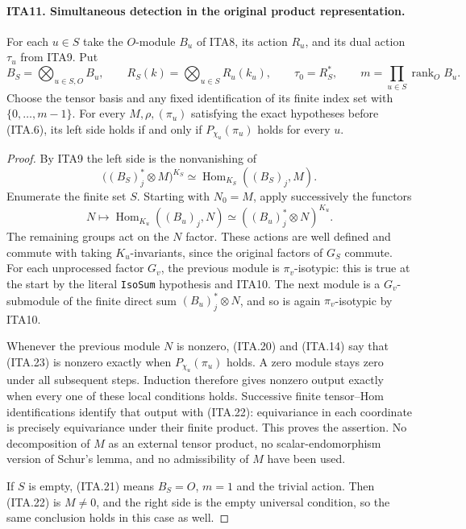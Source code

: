 \documentclass[11pt,a4paper]{article}
\numberwithin{equation}{section}
\theoremstyle{remark}\newtheorem{remark}[theorem]{Remark}
\begin{document}
\paragraph{ITA11. Simultaneous detection in the original product representation.}
\label{claim:ITA11}
For each $u\in S$ take the $O$-module $B_u$ of ITA8,
its action $R_u$, and its dual action $\tau_u$ from ITA9.
Put
\[
 B_S=\bigotimes_{u\in S,O}B_u,\qquad
 R_S(k)=\bigotimes_{u\in S}R_u(k_u),\qquad
 \tau_0=R_S^*,\qquad m=\prod_{u\in S}\operatorname{rank}_O B_u.
                                                               \tag{ITA.21}
\]
Choose the tensor basis and any fixed identification of its
finite index set with $\{0,\ldots,m-1\}$.  For every
$M,\rho,(\pi_u)$ satisfying the exact hypotheses before
(ITA.6), its left side holds if and only if
$P_{\chi_u}(\pi_u)$ holds for every $u$.
\begin{proof}
By ITA9 the left side is the nonvanishing of
\[
 \bigl((B_S)_j^*\otimes M\bigr)^{K_S}
                \simeq\operatorname{Hom}_{K_S}((B_S)_j,M).
                                                               \tag{ITA.22}
\]
Enumerate the finite set $S$.  Starting with $N_0=M$,
apply successively the functors
\[
                    N\longmapsto
                    \operatorname{Hom}_{K_u}((B_u)_j,N)
                      \simeq((B_u)_j^*\otimes N)^{K_u}.
                                                               \tag{ITA.23}
\]
The remaining groups act on the $N$ factor.  These actions
are well defined and commute with taking $K_u$-invariants,
since the original factors of $G_S$ commute.  For each
unprocessed factor $G_v$, the previous module is
$\pi_v$-isotypic: this is true at the start by the
literal \texttt{Iso\allowbreak Sum} hypothesis and ITA10.  The next
module is a $G_v$-submodule of the finite direct sum
$(B_u)_j^*\otimes N$, and so is again $\pi_v$-isotypic
by ITA10.

Whenever the previous module $N$ is nonzero, (ITA.20)
and (ITA.14) say that (ITA.23) is nonzero exactly when
$P_{\chi_u}(\pi_u)$ holds.  A zero module stays zero
under all subsequent steps.  Induction therefore gives
nonzero output exactly when every one of these local
conditions holds.  Successive finite tensor--Hom
identifications identify that output with (ITA.22):
equivariance in each coordinate is precisely equivariance
under their finite product.  This proves the assertion.
No decomposition of $M$ as an external tensor product,
no scalar-endomorphism version of Schur's lemma, and no
admissibility of $M$ have been used.

If $S$ is empty, (ITA.21) means $B_S=O$, $m=1$ and
the trivial action.  Then (ITA.22) is $M\ne0$, and
the right side is the empty universal condition, so the
same conclusion holds in this case as well.
\end{proof}
\end{document}
